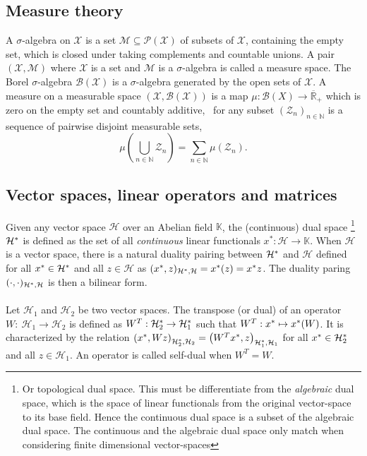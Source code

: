\subsection{Measure theory}
A $\sigma$-algebra on $\mathcal{X}$ is a set $\mathcal{M}\subseteq\mathcal{P}(\mathcal{X})$ of subsets of $\mathcal{X}$, containing the empty set, which is closed under taking complements and countable unions. A pair $(\mathcal{X},\mathcal{M})$ where $\mathcal{X}$ is a set and $\mathcal{M}$ is a $\sigma$-algebra is called a measure space. The Borel $\sigma$-algebra $\mathcal{B}(\mathcal{X})$ is a $\sigma$-algebra generated by the open sets of $\mathcal{X}$. A measure on a measurable space $(\mathcal{X},\mathcal{B}(\mathcal{X}))$ is a map $\mu: \mathcal{B}(X) \to \overline{\mathbb{R}}_+$ which is zero on the empty set and countably additive, \ie~for any subset $(\mathcal{Z}_n)_{n\in\mathbb{N}}$ is a sequence of pairwise disjoint measurable sets,
\begin{dmath*}
\mu\left(\bigcup_{n\in\mathbb{N}}\mathcal{Z}_n\right)=\sum_{n\in\mathbb{N}}\mu(\mathcal{Z}_n).
\end{dmath*}

\subsection{Vector spaces, linear operators and matrices}
Given any vector space $\mathcal{H}$ over an Abelian field $\mathbb{K}$, the (continuous) dual space \footnote{Or topological dual space. This must be differentiate from the \emph{algebraic} dual space, which is the space of linear functionals from the original vector-space to its base field. Hence the continuous dual space is a subset of the algebraic dual space. The continuous and the algebraic dual space only match when considering finite dimensional vector-spaces} $\mathcal{H}^\adjoint$ is defined as the set of all \emph{continuous} linear functionals $x^*: \mathcal{H} \to \mathbb{K}$. When $\mathcal{H}$ is a vector space, there is a natural duality pairing between $\mathcal{H}^\adjoint$ and $\mathcal{H}$ defined for all $x^\adjoint\in\mathcal{H}^\adjoint$ and all $z\in\mathcal{H}$ as $\pairing{x^\adjoint, z}_{\mathcal{H}^\adjoint,\mathcal{H}}=x^\adjoint(z)=x^\adjoint z$. The duality paring $\pairing{\cdot, \cdot}_{\mathcal{H}^\adjoint,\mathcal{H}}$ is then a bilinear form.
\paragraph{}
Let $\mathcal{H}_1$ and $\mathcal{H}_2$ be two vector spaces. The transpose (or dual) of an operator $W:~\mathcal{H}_1\to\mathcal{H}_2$ is defined as $W^T:\mathcal{H}_2^\adjoint \to \mathcal{H}_1^\adjoint$ such that $W^T:x^\adjoint\mapsto x^\adjoint(W)$. It is characterized by the relation $\pairing*{x^\adjoint, Wz}_{\mathcal{H}_2^\adjoint,\mathcal{H}_2}=\pairing*{W^Tx^\adjoint, z}_{\mathcal{H}_1^\adjoint,\mathcal{H}_1}$ for all $x^\adjoint\in\mathcal{H}_2^\adjoint$ and all $z\in\mathcal{H}_1$. An operator is called self-dual when $W^T=W$.
